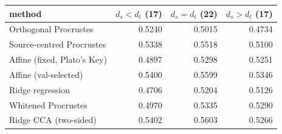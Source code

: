 \begin{tabular}{lrrr}
\toprule
method & $d_s < d_t$ (17) & $d_s = d_t$ (22) & $d_s > d_t$ (17) \\
\midrule
Orthogonal Procrustes & 0.5240 & 0.5015 & 0.4734 \\
Source-centred Procrustes & 0.5338 & 0.5518 & 0.5100 \\
Affine (fixed, Plato's Key) & 0.4897 & 0.5298 & 0.5251 \\
Affine (val-selected) & 0.5400 & 0.5599 & 0.5346 \\
Ridge regression & 0.4706 & 0.5204 & 0.5126 \\
Whitened Procrustes & 0.4970 & 0.5335 & 0.5290 \\
Ridge CCA (two-sided) & 0.5402 & 0.5603 & 0.5266 \\
\bottomrule
\end{tabular}